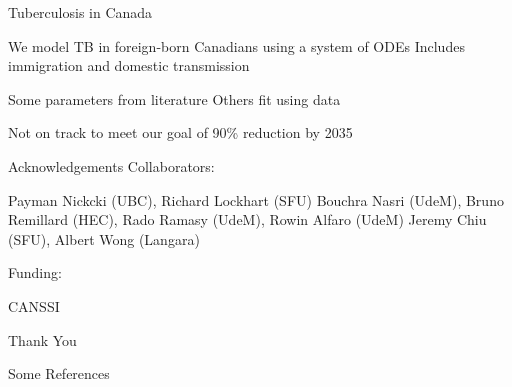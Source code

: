 \documentclass[14pt]{beamer}
\begin{document}
\begin{frame}{Tuberculosis in Canada}
    \begin{outline}
        \1 We model TB in foreign-born Canadians using a system of ODEs
            \2 Includes immigration and domestic transmission \newline

        \1 Some parameters from literature
        \1 Others fit using data \newline

        \1 Not on track to meet our goal of 90\% reduction by 2035

    \end{outline}
\end{frame}




\begin{frame}{Acknowledgements}
    Collaborators:
    \begin{outline}
        \1 Payman Nickcki (UBC), Richard Lockhart (SFU)
        \1 Bouchra Nasri (UdeM), Bruno Remillard (HEC), Rado Ramasy (UdeM), Rowin Alfaro (UdeM)
        \1 Jeremy Chiu (SFU), Albert Wong (Langara) \newline
    \end{outline}

    Funding:
    \begin{outline}
        \1 CANSSI
    \end{outline}
\end{frame}



\begin{frame}
    \centering
    \Huge Thank You
\end{frame}

\begin{frame}{Some References}
    
    
\end{frame}
\end{document}
